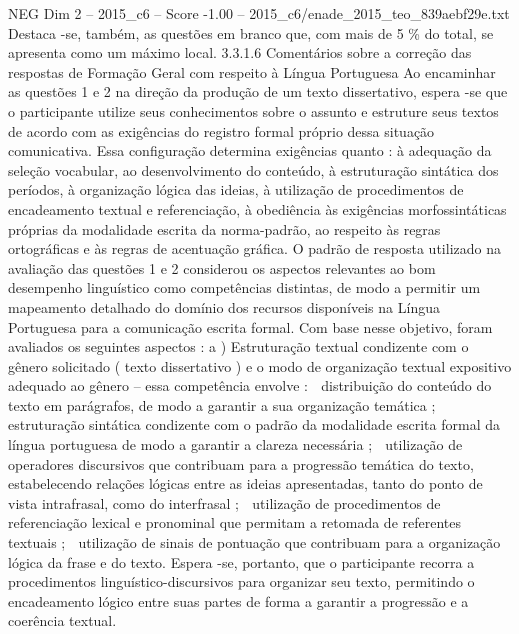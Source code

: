 \begin{textsample}{NEG Dim 2 – 2015\_c6 – Score -1.00 – 2015\_c6/enade\_2015\_teo\_839aebf29e.txt}
Destaca -se, também, as questões em branco que, com mais de 5 \% do total, se apresenta como um máximo local. 3.3.1.6 Comentários sobre a correção das respostas de Formação Geral com respeito à Língua Portuguesa Ao encaminhar as questões 1 e 2 na direção da produção de um texto dissertativo, espera -se que o participante utilize seus conhecimentos sobre o assunto e estruture seus textos de acordo com as exigências do registro formal próprio dessa situação comunicativa.
Essa configuração determina exigências quanto : à adequação da seleção vocabular, ao desenvolvimento do conteúdo, à estruturação sintática dos períodos, à organização lógica das ideias, à utilização de procedimentos de encadeamento textual e referenciação, à obediência às exigências morfossintáticas próprias da modalidade escrita da norma-padrão, ao respeito às regras ortográficas e às regras de acentuação gráfica.
O padrão de resposta utilizado na avaliação das questões 1 e 2 considerou os aspectos relevantes ao bom desempenho linguístico como competências distintas, de modo a permitir um mapeamento detalhado do domínio dos recursos disponíveis na Língua Portuguesa para a comunicação escrita formal.
Com base nesse objetivo, foram avaliados os seguintes aspectos : a ) Estruturação textual condizente com o gênero solicitado ( texto dissertativo ) e o modo de organização textual expositivo adequado ao gênero – essa competência envolve :  distribuição do conteúdo do texto em parágrafos, de modo a garantir a sua organização temática ;  estruturação sintática condizente com o padrão da modalidade escrita formal da língua portuguesa de modo a garantir a clareza necessária ;  utilização de operadores discursivos que contribuam para a progressão temática do texto, estabelecendo relações lógicas entre as ideias apresentadas, tanto do ponto de vista intrafrasal, como do interfrasal ;  utilização de procedimentos de referenciação lexical e pronominal que permitam a retomada de referentes textuais ;  utilização de sinais de pontuação que contribuam para a organização lógica da frase e do texto.
Espera -se, portanto, que o participante recorra a procedimentos linguístico-discursivos para organizar seu texto, permitindo o encadeamento lógico entre suas partes de forma a garantir a progressão e a coerência textual.

\end{textsample}
